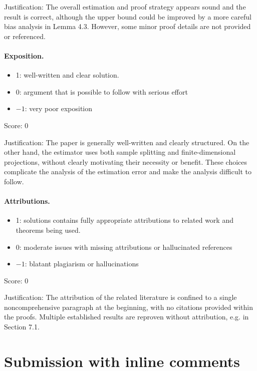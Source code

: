 \documentclass[11pt]{article}
\theoremstyle{remark}
\begin{document}
\noindent Justification: The overall estimation and proof strategy appears sound and the result is correct, although the upper bound could be improved by a more careful bias analysis in Lemma 4.3. However, some minor proof details are not provided or referenced.

\paragraph{Exposition.}
\begin{itemize}
	\item  1: well-written and clear solution.
	\item  0: argument that is possible to follow with serious effort
	\item  $-1$: very poor exposition
\end{itemize}

\noindent Score: 0

\noindent Justification: The paper is generally well-written and clearly structured. On the other hand, the estimator uses both sample splitting and finite-dimensional projections, without clearly motivating their necessity or benefit. These choices complicate the analysis of the estimation error and make the analysis difficult to follow.

\paragraph{Attributions.}
\begin{itemize}
	\item  1: solutions contains fully appropriate attributions
		to related work and theorems being used.
	\item  0: moderate issues with missing attributions or hallucinated references
	\item  $-1$: blatant plagiarism or hallucinations
\end{itemize}

\noindent Score: 0

\noindent Justification: The attribution of the related literature is confined to a single noncomprehensive paragraph at the beginning, with no citations provided within the proofs. Multiple established results are reproven without attribution, e.g. in Section 7.1.

\newpage
\section{Submission with inline comments}
\end{document}
